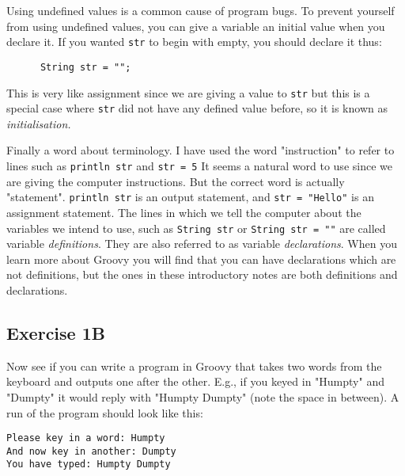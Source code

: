 Using undefined values is a common cause of program
bugs.  %
%
To prevent yourself from using undefined values, you can give a variable
an initial value when you declare it.  If you wanted \verb!str! to begin
with empty, you should declare it thus:

\begin{Verbatim}
      String str = "";
\end{Verbatim}

This is very like assignment since we are giving a value to \verb!str! but
this is a special case where \verb!str! did not have any defined value before,
so it is known as \emph{initialisation.}

Finally a word about terminology.  I have used the word "instruction"
to refer to lines such as \verb!println str! and \verb!str = 5!
It seems a natural word to use since we are giving the computer instructions.
But the correct word is actually "statement".  \verb!println str! is
an output statement, and \verb!str = "Hello"! is an assignment statement.
The lines in which we tell the computer about the variables we intend to
use, such as \verb!String str! or \verb!String str = ""! are called
variable \emph{definitions}.  They are also referred to as 
variable \emph{declarations}.  When you learn more about Groovy you will
find that you can have declarations which are not definitions, but the
ones in these introductory notes are both definitions and declarations.

\subsection{Exercise 1B}

Now see if you can write a program in Groovy that takes
two words from the keyboard and outputs one after the other. E.g., if
you keyed in "Humpty" and "Dumpty" 
it would reply with "Humpty Dumpty" (note the space in between).
A run of the program should look like this:
\begin{Verbatim}
Please key in a word: Humpty
And now key in another: Dumpty
You have typed: Humpty Dumpty
\end{Verbatim}


 	

